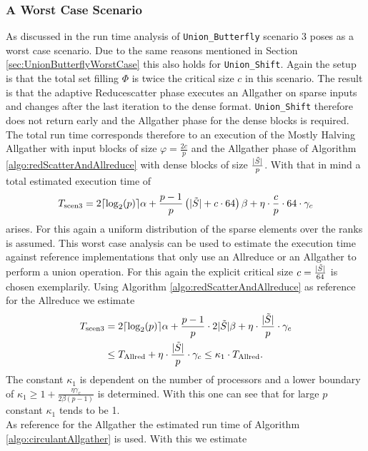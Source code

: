 \subsubsection{A Worst Case Scenario}
As discussed in the run time analysis of \texttt{Union\_Butterfly} scenario 3 poses as a worst case scenario. Due to the same reasons mentioned in Section \ref{sec:UnionButterflyWorstCase} this also holds for \texttt{Union\_Shift}. Again the setup is that the total set filling $\Phi$ is twice the critical size $c$ in this scenario. The result is that the adaptive Reducescatter phase executes an Allgather on sparse inputs and changes after the last iteration to the dense format. \texttt{Union\_Shift} therefore does not return early and the Allgather phase for the dense blocks is required. The total run time corresponds therefore to an execution of the Mostly Halving Allgather with input blocks of size $\varphi=\frac{2c}{p}$ and the Allgather phase of Algorithm \ref{algo:redScatterAndAllreduce} with dense blocks of size $\frac{|\Tilde{S}|}{p}$. With that in mind a total estimated execution time of 
\begin{align*}
	T_\mathrm{scen3} = 2 \lceil\log_2(p)\rceil\alpha 
	+ \frac{p-1}{p}\left(|\tilde{S}| + c\cdot 64\right)\beta
	+ \eta \cdot \frac{c}{p} \cdot 64 \cdot \gamma_c
\end{align*}
arises. For this again a uniform distribution of the sparse elements over the ranks is assumed. This worst case analysis can be used to estimate the execution time against reference implementations that only use an Allreduce or an Allgather to perform a union operation. For this again the explicit critical size $c=\frac{|\Tilde{S}|}{64}$ is chosen exemplarily. Using Algorithm \ref{algo:redScatterAndAllreduce} as reference for the Allreduce we estimate 
\begin{align*}
	T_\mathrm{scen3} &= 2 \lceil\log_2(p)\rceil\alpha 
	+ \frac{p-1}{p}\cdot 2 |\tilde{S}| \beta
	+ \eta \cdot \frac{|\Tilde{S}|}{p} \cdot \gamma_c \\
	&\leq T_\mathrm{Allred} + \eta \cdot \frac{|\Tilde{S}|}{p} \cdot \gamma_c 
	\leq \kappa_1 \cdot T_\mathrm{Allred}.
\end{align*}
The constant $\kappa_1$ is dependent on the number of processors and a lower boundary of $\kappa_1 \geq 1 + \frac{\eta \gamma_c}{2\beta(p-1)}$ is determined. With this one can see that for large $p$ constant $\kappa_1$ tends to be 1.\\
As reference for the Allgather the estimated run time of Algorithm \ref{algo:circulantAllgather} is used. With this we estimate 
